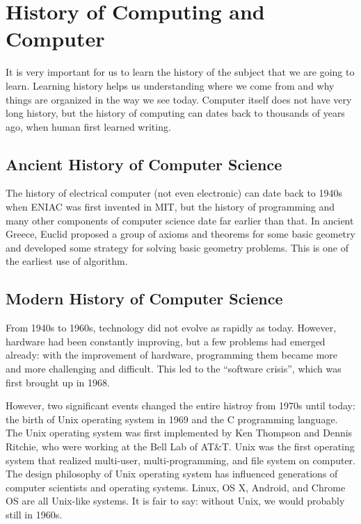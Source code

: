 \documentclass[../main.tex]{subfiles}
\begin{document}
    \section{History of Computing and Computer}
    It is very important for us to learn the history of the subject that we are
    going to learn. Learning history helps us understanding where we come from
    and why things are organized in the way we see today. Computer itself does
    not have very long history, but the history of computing can dates back to
    thousands of years ago, when human first learned writing.

    \subsection{Ancient History of Computer Science}
    The history of electrical computer (not even electronic) can date back to 1940s
    when ENIAC was first invented in MIT, but the history of programming and many
    other components of computer science date far earlier than that. In ancient
    Greece, Euclid proposed a group of axioms and theorems for some basic geometry
    and developed some strategy for solving basic geometry problems. This is one of
    the earliest use of algorithm.

    \subsection{Modern History of Computer Science}
    From 1940s to 1960s, technology did not evolve as rapidly as today. However,
    hardware had been constantly improving, but a few problems had emerged already:
    with the improvement of hardware, programming them became more and more
    challenging and difficult. This led to the ``software crisis'', which was first
    brought up in 1968.

    However, two significant events changed the entire histroy from 1970s until
    today: the birth of Unix operating system in 1969 and the C programming language.
    The Unix operating system was first implemented by Ken Thompson and Dennis
    Ritchie, who were working at the Bell Lab of AT\&T. Unix was the first operating
    system that realized multi-user, multi-programming, and file system on computer.
    The design philosophy of Unix operating system has influenced generations of
    computer scientists and operating systems. Linux, OS X, Android, and Chrome OS
    are all Unix-like systems. It is fair to say: without Unix, we would probably
    still in 1960s.
\end{document}

